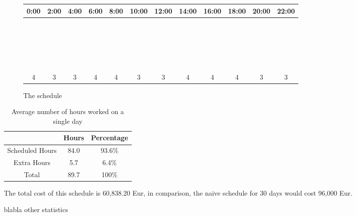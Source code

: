 \begin{figure}
	\centering
\begin{tabular}{|c|c|c|c|c|c|c|c|c|c|c|c|}
	\hline
	0:00 & 2:00 & 4:00 & 6:00 & 8:00 & 10:00 & 12:00 & 14:00 & 16:00 & 18:00 & 20:00 & 22:00  \\
	\hline
	\hline
	\cc & \cc & & & & & & & & & & \\ \hline
	& \cc & \cc & & & & & & & & & \\ \hline
	& \cc & \cc & & & & & & & & & \\ \hline
	& & \cc & \cc & & & & & & & & \\ \hline
	& & & \cc & \cc & & & & & & & \\ \hline
	& & & \cc & \cc & & & & & & & \\ \hline
	& & & \cc & \cc & & & & & & & \\ \hline
	& & & & \cc & \cc & & & & & & \\ \hline
	& & & & & \cc & \cc & & & & & \\ \hline
	& & & & & \cc & \cc & & & & & \\ \hline
	& & & & & & \cc & \cc & & & & \\ \hline
	& & & & & & & \cc & \cc & & & \\ \hline
	& & & & & & & \cc & \cc & & & \\ \hline
	& & & & & & & \cc & \cc & & & \\ \hline
	& & & & & & & & \cc & \cc & & \\ \hline
	& & & & & & & & & \cc & \cc & \\ \hline
	& & & & & & & & & \cc & \cc & \\ \hline
	& & & & & & & & & \cc & \cc & \\ \hline
	\cc & & & & & & & & & & & \cc \\ \hline
	\cc & & & & & & & & & & & \cc \\ \hline
	\cc & & & & & & & & & & & \cc \\ 
	\hline
	\hline
	4 & 3 & 3 & 4 & 4 & 3 & 3 & 4 & 4 & 4 & 3 & 3\\
	\hline
\end{tabular}
\caption{The schedule}
\label{fig:schedule}
\end{figure}

\begin{table}
	\centering
\begin{tabular}{|c|c|c|}
	\hline
	& Hours & Percentage \\ \hline \hline
	Scheduled Hours & 84.0 & 93.6\%\\
	Extra Hours & 5.7 & 6.4\% \\
	\hline
	\hline
	Total & 89.7 & 100\% \\
	\hline
\end{tabular}
\caption{Average number of hours worked on a single day}
\label{tab:hours}
\end{table}

The total cost of this schedule is 60,838.20 Eur, in comparison, the naive schedule for 30 days would cost 96,000 Eur.

blabla other statistics